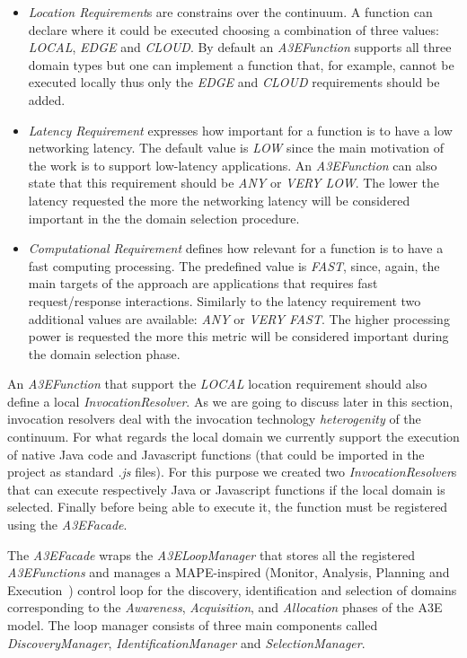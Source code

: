 \begin{itemize}
	\item \textit{Location Requirement}s are constrains over the continuum. A function can declare where it could be executed choosing a combination of three values: \textit{LOCAL}, \textit{EDGE} and \textit{CLOUD}. By default an \textit{A3EFunction} supports all three domain types but one can implement a function that, for example, cannot be executed locally thus only the \textit{EDGE} and \textit{CLOUD} requirements should be added.    
	\item \textit{Latency Requirement} expresses how important for a function is to have a low networking latency. The default value is \textit{LOW} since the main motivation of the work is to support low-latency applications. An \textit{A3EFunction}  can  also state that this requirement should be \textit{ANY} or \textit{VERY LOW}. The lower the latency requested the more the networking latency will be considered important in the the domain selection procedure.
	\item \textit{Computational Requirement} defines how relevant for a function is to have a fast computing processing. The predefined value is \textit{FAST}, since, again, the main targets of the approach are applications that requires fast request/response interactions. Similarly to the latency requirement two additional values are available:  \textit{ANY} or \textit{VERY FAST}. The higher  processing power is requested the more this metric will be considered important during the domain selection phase.
\end{itemize}

An \textit{A3EFunction} that support the \textit{LOCAL} location requirement should also define a local \textit{InvocationResolver}. As we are going to discuss later in this section, invocation resolvers deal with the invocation technology \textit{heterogenity}  of the continuum. For what regards the local domain we currently support the execution of native Java code and Javascript functions (that could be imported in the project as standard \textit{.js} files). For this purpose we created two \textit{InvocationResolver}s that can execute respectively Java or Javascript functions if the local domain is selected.  Finally before being able to execute it, the function must be registered using the \textit{A3EFacade}.

The \textit{A3EFacade} wraps the \textit{A3ELoopManager} that stores all the registered \textit{A3EFunctions} and manages a MAPE-inspired (Monitor, Analysis, Planning and Execution~\cite{kephart2003vision}) control loop for the discovery, identification and selection of domains corresponding to the \textit{Awareness}, \textit{Acquisition}, and \textit{Allocation} phases of the A3E model. The loop manager  consists of three main components called \textit{DiscoveryManager}, \textit{IdentificationManager} and \textit{SelectionManager}. 

